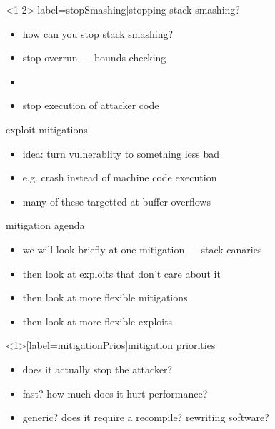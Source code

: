\begin{frame}<1-2>[label=stopSmashing]{stopping stack smashing?}
    \begin{itemize}
    \item how can you stop stack smashing?
    \vspace{.5cm}
    \item<2-> stop overrun --- bounds-checking
    \item<2-> 
    \item<2-> stop execution of attacker code
    \end{itemize}
\end{frame}


\begin{frame}{exploit mitigations}
    \begin{itemize}
    \item idea: turn vulnerablity to something less bad
    \item e.g. crash instead of machine code execution
    \vspace{.5cm}
    \item many of these targetted at buffer overflows
    \end{itemize}
\end{frame}

\begin{frame}{mitigation agenda}
    \begin{itemize}
        \item we will look briefly at one mitigation --- stack canaries
        \item then look at exploits that don't care about it
        \item then look at more flexible mitigations
        \item then look at more flexible exploits
    \end{itemize}
\end{frame}

\begin{frame}<1>[label=mitigationPrios]{mitigation priorities}
    \begin{itemize}
    \item {} does it actually stop the attacker?
    \item fast? how much does it hurt performance?
    \item generic? does it require a recompile? rewriting software?
    \end{itemize}

\end{frame}

